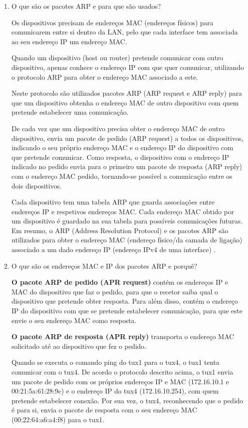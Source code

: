\documentclass{article}
\begin{document}
\begin{enumerate}

\item O que são os pacotes ARP e para que são usados?

Os dispositivos precisam de endereços MAC (endereços físicos) para comunicarem entre si dentro da LAN, pelo que cada interface tem associada ao seu endereço IP um endereço MAC.

Quando um dispositivo (host ou router) pretende comunicar com outro dispositivo, apenas conhece o endereço IP com que quer comunicar, utilizando o protocolo ARP para obter o endereço MAC associado a este.

Neste protocolo são utilizados pacotes ARP (ARP request e ARP reply) para que um dispositivo obtenha o endereço MAC de outro dispositivo com quem pretende estabelecer uma comunicação. 

De cada vez que um dispositivo precisa obter o endereço MAC de outro dispositivo, envia um pacote de pedido (ARP request) a todos os dispositivos, indicando o seu próprio endereço MAC e o endereço IP do dispositivo com que pretende comunicar. Como resposta, o dispositivo com o endereço IP indicado no pedido envia para o primeiro um pacote de resposta (ARP reply) com o endereço MAC pedido, tornando-se possível a comunicação entre os dois dispositivos.

Cada dispositivo tem uma tabela ARP que guarda associações entre endereços IP e respetivos endereços MAC. Cada endereço MAC obtido por um dispositivo é guardado na sua tabela para possíveis comunicações futuras.
Em resumo, o ARP (Address Resolution Protocol) e os pacotes ARP são utilizados para obter o endereço MAC (endereço físico/da camada de ligação) associado a um dado endereço IP (endereço IPv4 de uma interface) . 


\item O que são os endereços MAC e IP dos pacotes ARP e porquê?

\textbf{O pacote ARP de pedido (APR request)} contém os endereços IP e MAC do dispositivo que faz o pedido, para que o recetor saiba qual o dispositivo que pretende obter resposta. Para além disso, contém o endereço IP do dispositivo com que se pretende estabelecer comunicação, para que este envie o seu endereço MAC como resposta. 

\textbf{O pacote ARP de resposta (APR reply)} transporta o endereço MAC solicitado até ao dispositivo que fez o pedido. 

Quando se executa o comando ping do tux1 para o tux4, o tux1 tenta comunicar com o tux4. De acordo o protocolo descrito acima, o tux1 envia um pacote de pedido com os próprios endereços IP e MAC (172.16.10.1 e 00:21:5a:61:28:9c) e o endereço IP do tux4 (172.16.10.254), com quem pretende estabelecer conexão. Por sua vez, o tux4, reconhecendo que o pedido é para si, envia o pacote de resposta com o seu endereço MAC (00:22:64:a6:a4:f8) para o tux1.



\end{enumerate}
\end{document}
